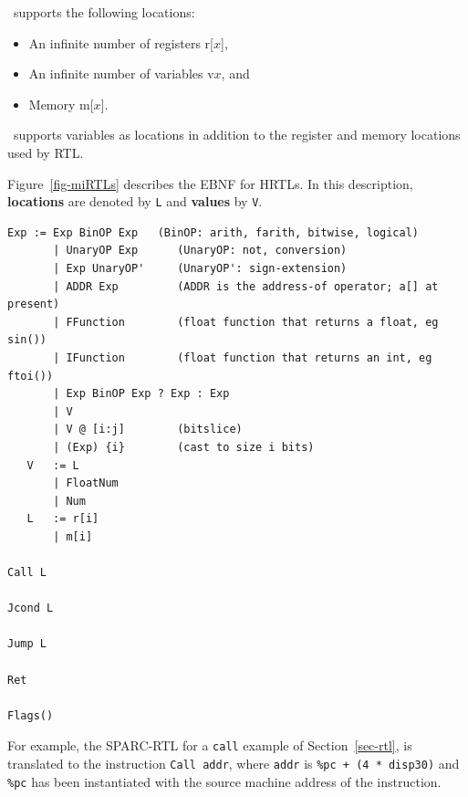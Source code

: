 \hrtl\ supports the following locations:
\begin{itemize}
\item An infinite number of registers r[$x$],
\item An infinite number of variables v$x$, and
\item Memory m[$x$].
\end{itemize}
\hrtl\ supports variables as locations
in addition to the register and memory locations
used by RTL.

Figure~\ref{fig-miRTLs} describes the EBNF for HRTLs.
In this description,
{\bf locations} are denoted by \texttt{L} 
and {\bf values} by \texttt{V}.   

\centerfigbegin
\begin{verbatim}
Exp := Exp BinOP Exp   (BinOP: arith, farith, bitwise, logical)
       | UnaryOP Exp      (UnaryOP: not, conversion)
       | Exp UnaryOP'     (UnaryOP': sign-extension)
       | ADDR Exp         (ADDR is the address-of operator; a[] at present)
       | FFunction        (float function that returns a float, eg sin())
       | IFunction        (float function that returns an int, eg ftoi())
       | Exp BinOP Exp ? Exp : Exp 
       | V
       | V @ [i:j]        (bitslice)
       | (Exp) {i}        (cast to size i bits)
   V   := L 
       | FloatNum
       | Num
   L   := r[i]
       | m[i]

Call L

Jcond L

Jump L

Ret

Flags() 
\end{verbatim}


For example, the SPARC-RTL for a \texttt{call} example of 
Section~\ref{sec-rtl}, is translated to the {\hrtl} instruction 
\texttt{Call addr},
where \texttt{addr} is \texttt{\%pc + (4 * disp30)} and \texttt{\%pc}
has been instantiated with the source machine address of the instruction.



